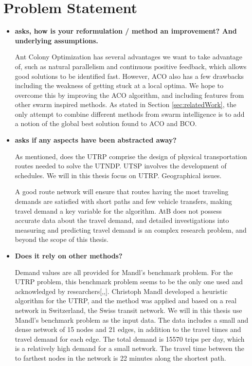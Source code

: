 \section{Problem Statement}

\begin{itemize}
\item \citet{cohen88} \textbf{asks, how is your reformulation / method an improvement? And underlying assumptions.}

Ant Colony Optimization has several advantages we want to take advantage of, such as natural parallelism and continuous positive feedback, which allows good solutions to be identified fast. However, ACO also has a few drawbacks including the weakness of getting stuck at a local optima. We hope to overcome this by improving the ACO algorithm, and including features from other swarm inspired methods. As stated in Section \vref{sec:relatedWork}, the only attempt to combine different methods from swarm intelligence is to add a notion of the global best solution found to ACO and BCO. 

\item \citet{cohen88} \textbf{asks if any aspects have been abstracted away?}

As mentioned, does the UTRP comprise the design of physical transportation routes needed to solve the UTNDP. UTSP involves the development of schedules. We will in this thesis focus on UTRP. Geographical issues.

A good route network will ensure that routes having the most traveling demands are satisfied with short paths and few vehicle transfers, making travel demand a key variable for the algorithm. AtB\citep{website:atb} does not possess accurate data about the travel demand, and detailed investigations into measuring and predicting travel demand is an complex research problem, and beyond the scope of this thesis. 

\item \citet{cohen88} \textbf{Does it rely on other methods?}

Demand values are all provided for Mandl's benchmark problem. For the UTRP problem, this benchmark problem seems to be the only one used and acknowledged by researchers[\citep{fan09},\citep{kechagiopoulos14},\citep{nikolic14}]. Christoph Mandl\citep{mandl79} developed a heuristic algorithm for the UTRP, and the method was applied and based on a real network in Switzerland, the Swiss transit network\citep{mandl80}. We will in this thesis use Mandl's benchmark problem \citep{mandl79} as the input data. The data includes a small and dense network of 15 nodes and 21 edges, in addition to the travel times and travel demand for each edge. The total demand is 15570 trips per day, which is a relatively high demand for a small network. The travel time between the to farthest nodes in the network is 22 minutes along the shortest path. 


\end{itemize}
